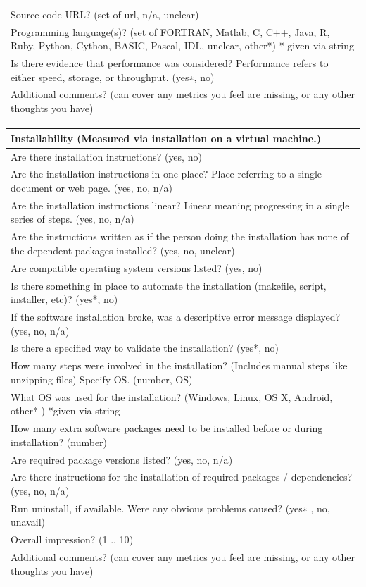 \documentclass[12pt, notitlepage]{article}
\begin{document}
\begin{singlespace}
\begin{tabular}{p{16cm}}
		Source code URL? ({set of url, n/a, unclear})\\
		Programming language(s)? (set of {FORTRAN, Matlab, C, C++, Java, R, Ruby, Python, Cython, BASIC, Pascal, IDL, unclear, other*}) * given via string \\
		Is there evidence that performance was considered? Performance refers to either speed, storage, or throughput. ({yes∗, no})\\
		Additional comments? (can cover any metrics you feel are missing, or any other thoughts you have) \\
		\hline
\end{tabular}

\def\arraystretch{1.5}
\begin{tabular}{p{16cm}}
		\hline		
		\textbf{Installability  (Measured via installation on a virtual machine.) }\\
		\hline
		Are there installation instructions? ({yes, no})\\
		Are the installation instructions in one place? Place referring to a single document or web page. ({yes, no, n/a})\\
		Are the installation instructions linear? Linear meaning progressing  in a single series of steps. ({yes, no, n/a})\\
		Are the instructions written as if the person doing the installation has none of the dependent packages installed? ({yes, no, unclear})\\
		Are compatible operating system versions listed? ({yes, no})\\
		Is there something in place to automate the installation (makefile, script, installer, etc)? ({yes*, no})\\
		If the software installation broke, was a descriptive error message displayed? ({yes, no, n/a})\\
		Is there a specified way to validate the installation? ({yes*, no})\\
		How many steps were involved in the installation? (Includes manual steps like unzipping files) Specify OS. (number, OS)\\
		What OS was used for the installation? ({Windows, Linux, OS X, Android, other* }) *given via string\\
		How many extra software packages need to be installed before or during installation? (number)\\
		Are required package versions listed? ({yes, no, n/a})\\
		Are there instructions for the installation of required packages / dependencies? ({yes, no, n/a})\\
		Run uninstall, if available. Were any obvious problems caused? ({yes∗ , no, unavail})\\
		Overall impression? ({1 .. 10})\\
		Additional comments? (can cover any metrics you feel are missing, or any other thoughts you have)\\
		\hline
\end{tabular}


\end{singlespace}
\end{document}
